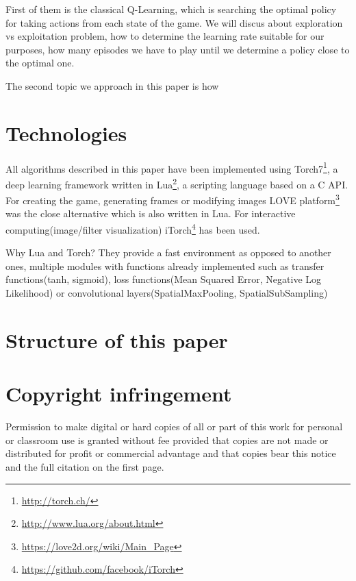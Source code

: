 First of them is the classical Q-Learning, which is searching the optimal policy for taking actions from each state of the game. We will discus about exploration vs exploitation problem, how to determine the learning rate suitable for our purposes, how many episodes we have to play until we determine a policy close to the optimal one.

The second topic we approach in this paper is how

\section{Technologies}
\label{sec:technologies}
All algorithms described in this paper have been implemented using Torch7\footnote{\url{http://torch.ch/}}, a deep learning framework written in Lua\footnote{\url{http://www.lua.org/about.html}}, a scripting language based on a C API. For creating the game, generating frames or modifying images LOVE platform\footnote{\url{https://love2d.org/wiki/Main_Page}} was the close alternative which is also written in Lua. For interactive computing(image/filter visualization) iTorch\footnote{\url{https://github.com/facebook/iTorch}} has been used.

Why Lua and Torch? They provide a fast environment as opposed to another ones\cite{torch7}, multiple modules with functions already implemented such as transfer functions(tanh, sigmoid), loss functions(Mean Squared Error, Negative Log Likelihood) or convolutional layers(SpatialMaxPooling, SpatialSubSampling)

\section{Structure of this paper}
\label{sec:paper_structure}






\section{Copyright infringement}
\label{sec:copyright}
Permission to make digital or hard copies of all or part of this work for personal or classroom use is granted without fee provided that copies are not made or distributed for profit or commercial advantage and that copies bear this notice and the full citation on the first page. 







